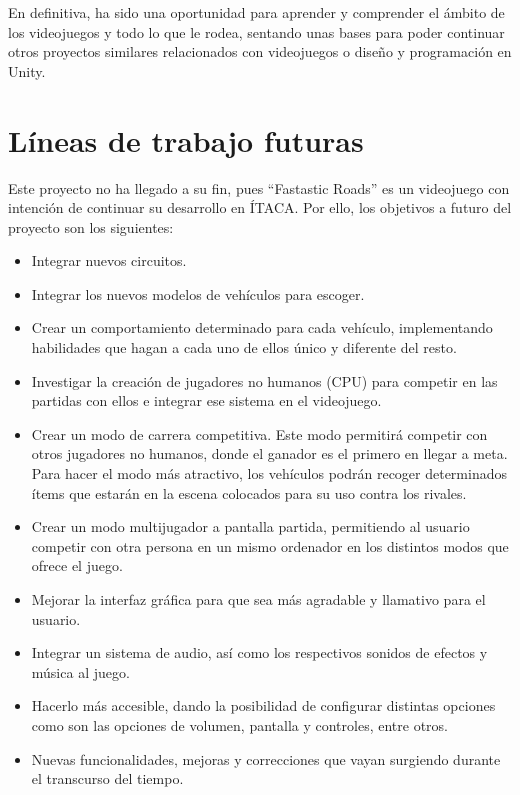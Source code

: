 En definitiva, ha sido una oportunidad para aprender y comprender el ámbito de los videojuegos y todo lo que le rodea, sentando unas bases para poder continuar otros proyectos similares relacionados con videojuegos o diseño y programación en Unity.

\section{Líneas de trabajo futuras}

Este proyecto no ha llegado a su fin, pues ``Fastastic Roads'' es un videojuego con intención de continuar su desarrollo en ÍTACA. Por ello, los objetivos a futuro del proyecto son los siguientes:
\begin{itemize}
\tightlist
    \item Integrar nuevos circuitos.
    \item Integrar los nuevos modelos de vehículos para escoger.
    \item Crear un comportamiento determinado para cada vehículo, implementando habilidades que hagan a cada uno de ellos único y diferente del resto.
    \item Investigar la creación de jugadores no humanos (CPU) para competir en las partidas con ellos e integrar ese sistema en el videojuego.
    \item Crear un modo de carrera competitiva. Este modo permitirá competir con otros jugadores no humanos, donde el ganador es el primero en llegar a meta. Para hacer el modo más atractivo, los vehículos podrán recoger determinados ítems que estarán en la escena colocados para su uso contra los rivales.
    \item Crear un modo multijugador a pantalla partida, permitiendo al usuario competir con otra persona en un mismo ordenador en los distintos modos que ofrece el juego.
    \item Mejorar la interfaz gráfica para que sea más agradable y llamativo para el usuario.
    \item Integrar un sistema de audio, así como los respectivos sonidos de efectos y música al juego.
    \item Hacerlo más accesible, dando la posibilidad de configurar distintas opciones como son las opciones de volumen, pantalla y controles, entre otros.
    \item Nuevas funcionalidades, mejoras y correcciones que vayan surgiendo durante el transcurso del tiempo.
\end{itemize}